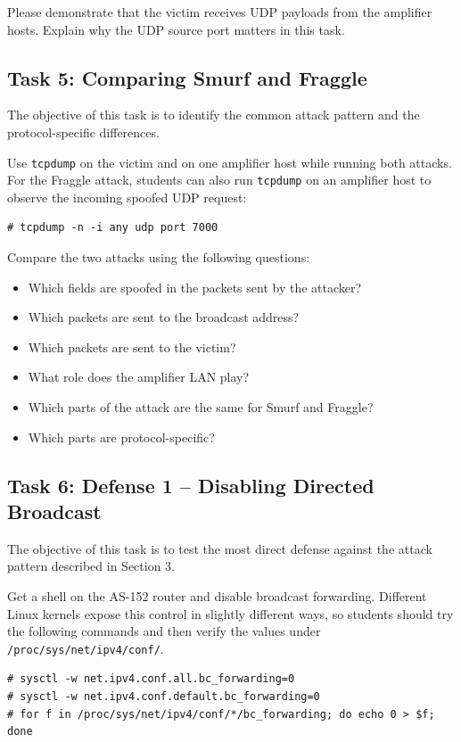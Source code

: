 Please demonstrate that the victim receives UDP payloads from the amplifier
hosts. Explain why the UDP source port matters in this task.


\subsection{Task 5: Comparing Smurf and Fraggle}

The objective of this task is to identify the common attack pattern and the
protocol-specific differences.

Use \texttt{tcpdump} on the victim and on one amplifier host while running both
attacks. For the Fraggle attack, students can also run \texttt{tcpdump} on an
amplifier host to observe the incoming spoofed UDP request:

\begin{lstlisting}
# tcpdump -n -i any udp port 7000
\end{lstlisting}

Compare the two attacks using the following questions:

\begin{itemize}[noitemsep]
\item Which fields are spoofed in the packets sent by the attacker?
\item Which packets are sent to the broadcast address?
\item Which packets are sent to the victim?
\item What role does the amplifier LAN play?
\item Which parts of the attack are the same for Smurf and Fraggle?
\item Which parts are protocol-specific?
\end{itemize}


\subsection{Task 6: Defense 1 -- Disabling Directed Broadcast}

The objective of this task is to test the most direct defense against the attack
pattern described in Section 3.

Get a shell on the AS-152 router and disable broadcast forwarding. Different
Linux kernels expose this control in slightly different ways, so students should
try the following commands and then verify the values under
\texttt{/proc/sys/net/ipv4/conf/}.

\begin{lstlisting}
# sysctl -w net.ipv4.conf.all.bc_forwarding=0
# sysctl -w net.ipv4.conf.default.bc_forwarding=0
# for f in /proc/sys/net/ipv4/conf/*/bc_forwarding; do echo 0 > $f; done
\end{lstlisting}

